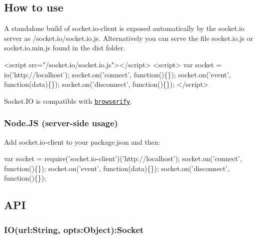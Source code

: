 \href{http://travis-ci.org/socketio/socket.io-client}{\tt } \href{https://david-dm.org/socketio/socket.io-client}{\tt } \href{https://david-dm.org/socketio/socket.io-client#info=devDependencies}{\tt }   \href{http://slack.socket.io}{\tt }

\href{https://saucelabs.com/u/socket}{\tt }

\subsection*{How to use}

A standalone build of {\ttfamily socket.\+io-\/client} is exposed automatically by the socket.\+io server as {\ttfamily /socket.io/socket.\+io.\+js}. Alternatively you can serve the file {\ttfamily socket.\+io.\+js} or {\ttfamily socket.\+io.\+min.\+js} found in the {\ttfamily dist} folder.


\begin{DoxyCode}
<script src="/socket.io/socket.io.js"></script>
<script>
  var socket = io('http://localhost');
  socket.on('connect', function()\{\});
  socket.on('event', function(data)\{\});
  socket.on('disconnect', function()\{\});
</script>
\end{DoxyCode}


Socket.\+IO is compatible with \href{http://browserify.org/}{\tt browserify}.

\subsubsection*{Node.\+JS (server-\/side usage)}

Add {\ttfamily socket.\+io-\/client} to your {\ttfamily package.\+json} and then\+:


\begin{DoxyCode}
var socket = require('socket.io-client')('http://localhost');
socket.on('connect', function()\{\});
socket.on('event', function(data)\{\});
socket.on('disconnect', function()\{\});
\end{DoxyCode}


\subsection*{A\+PI}

\subsubsection*{I\+O(url\+:\+String, opts\+:\+Object)\+:Socket}

